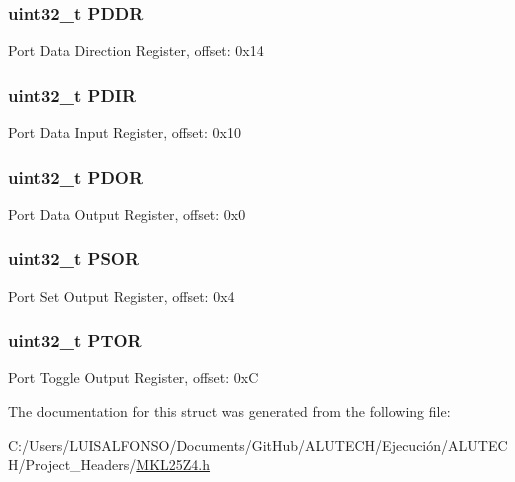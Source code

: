 \subsubsection[{P\+D\+D\+R}]{\setlength{\rightskip}{0pt plus 5cm}uint32\+\_\+t P\+D\+D\+R}\label{struct_f_g_p_i_o___mem_map_a37eee18eef001998403709bf78f4a33d}
Port Data Direction Register, offset\+: 0x14 \hypertarget{struct_f_g_p_i_o___mem_map_a4c83a78320344c89b1663969a7c5d749}{}
\subsubsection[{P\+D\+I\+R}]{\setlength{\rightskip}{0pt plus 5cm}uint32\+\_\+t P\+D\+I\+R}\label{struct_f_g_p_i_o___mem_map_a4c83a78320344c89b1663969a7c5d749}
Port Data Input Register, offset\+: 0x10 \hypertarget{struct_f_g_p_i_o___mem_map_a6d8857d2ca1928bcedd1a83e93946aef}{}
\subsubsection[{P\+D\+O\+R}]{\setlength{\rightskip}{0pt plus 5cm}uint32\+\_\+t P\+D\+O\+R}\label{struct_f_g_p_i_o___mem_map_a6d8857d2ca1928bcedd1a83e93946aef}
Port Data Output Register, offset\+: 0x0 \hypertarget{struct_f_g_p_i_o___mem_map_a2fc5ff57bdc9e1de4233930468cbf5e3}{}
\subsubsection[{P\+S\+O\+R}]{\setlength{\rightskip}{0pt plus 5cm}uint32\+\_\+t P\+S\+O\+R}\label{struct_f_g_p_i_o___mem_map_a2fc5ff57bdc9e1de4233930468cbf5e3}
Port Set Output Register, offset\+: 0x4 \hypertarget{struct_f_g_p_i_o___mem_map_a2a8b6ad3b774b37fcdf9a0f04f56e43b}{}
\subsubsection[{P\+T\+O\+R}]{\setlength{\rightskip}{0pt plus 5cm}uint32\+\_\+t P\+T\+O\+R}\label{struct_f_g_p_i_o___mem_map_a2a8b6ad3b774b37fcdf9a0f04f56e43b}
Port Toggle Output Register, offset\+: 0x\+C 

The documentation for this struct was generated from the following file\+:\begin{DoxyCompactItemize}
\item 
C\+:/\+Users/\+L\+U\+I\+S\+A\+L\+F\+O\+N\+S\+O/\+Documents/\+Git\+Hub/\+A\+L\+U\+T\+E\+C\+H/\+Ejecución/\+A\+L\+U\+T\+E\+C\+H/\+Project\+\_\+\+Headers/\hyperlink{_m_k_l25_z4_8h}{M\+K\+L25\+Z4.\+h}\end{DoxyCompactItemize}
